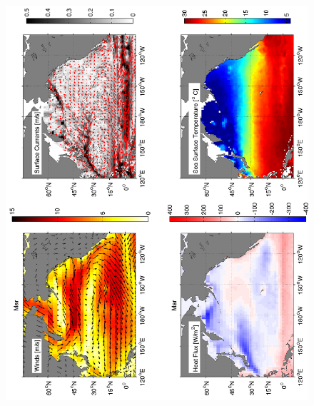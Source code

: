 \begin{figure}[hbt]
  \begin{center}
  \includegraphics[angle=270]{figs/WindOverview/SurfaceCurrents03}
    \caption{}
    \label{fig:}  
  \end{center}
\end{figure}

